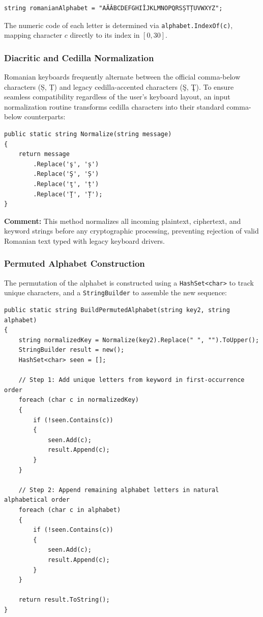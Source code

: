 \documentclass[12pt,a4paper]{article}
\begin{document}
\begin{lstlisting}[caption={Romanian Alphabet Definition}]
string romanianAlphabet = "AĂÂBCDEFGHIÎJKLMNOPQRSȘTȚUVWXYZ";
\end{lstlisting}

The numeric code of each letter is determined via \texttt{alphabet.IndexOf(c)}, mapping character $c$ directly to its index in $[0, 30]$.

\subsubsection{Diacritic and Cedilla Normalization}
Romanian keyboards frequently alternate between the official comma-below characters (Ș, Ț) and legacy cedilla-accented characters (Ş, Ţ). To ensure seamless compatibility regardless of the user's keyboard layout, an input normalization routine transforms cedilla characters into their standard comma-below counterparts:

\begin{lstlisting}[caption={Character Normalization Method in CaesarCipher.cs}]
public static string Normalize(string message)
{
    return message
        .Replace('ş', 'ș')
        .Replace('Ş', 'Ș')
        .Replace('ţ', 'ț')
        .Replace('Ţ', 'Ț');
}
\end{lstlisting}

\textbf{Comment:} This method normalizes all incoming plaintext, ciphertext, and keyword strings before any cryptographic processing, preventing rejection of valid Romanian text typed with legacy keyboard drivers.

\subsubsection{Permuted Alphabet Construction}
The permutation of the alphabet is constructed using a \texttt{HashSet<char>} to track unique characters, and a \texttt{StringBuilder} to assemble the new sequence:

\begin{lstlisting}[caption={Alphabet Permutation Construction in CaesarCipher2Key.cs}]
public static string BuildPermutedAlphabet(string key2, string alphabet)
{
    string normalizedKey = Normalize(key2).Replace(" ", "").ToUpper();
    StringBuilder result = new();
    HashSet<char> seen = [];

    // Step 1: Add unique letters from keyword in first-occurrence order
    foreach (char c in normalizedKey)
    {
        if (!seen.Contains(c))
        {
            seen.Add(c);
            result.Append(c);
        }
    }

    // Step 2: Append remaining alphabet letters in natural alphabetical order
    foreach (char c in alphabet)
    {
        if (!seen.Contains(c))
        {
            seen.Add(c);
            result.Append(c);
        }
    }

    return result.ToString();
}
\end{lstlisting}
\end{document}
